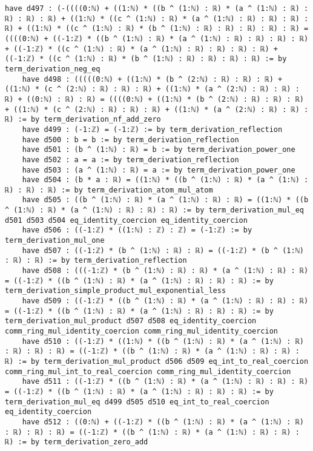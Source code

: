 \documentclass{article}
\begin{document}
\begin{tcolorbox}[colback=white!10, width=\linewidth]
\begin{lstlisting}[language=Lean4]
    have d497 : (-((((0:ℕ) + ((1:ℕ) * ((b ^ (1:ℕ) : ℝ) * (a ^ (1:ℕ) : ℝ) : ℝ) : ℝ) : ℝ) + ((1:ℕ) * ((c ^ (1:ℕ) : ℝ) * (a ^ (1:ℕ) : ℝ) : ℝ) : ℝ) : ℝ) + ((1:ℕ) * ((c ^ (1:ℕ) : ℝ) * (b ^ (1:ℕ) : ℝ) : ℝ) : ℝ) : ℝ) : ℝ) = ((((0:ℕ) + ((-1:ℤ) * ((b ^ (1:ℕ) : ℝ) * (a ^ (1:ℕ) : ℝ) : ℝ) : ℝ) : ℝ) + ((-1:ℤ) * ((c ^ (1:ℕ) : ℝ) * (a ^ (1:ℕ) : ℝ) : ℝ) : ℝ) : ℝ) + ((-1:ℤ) * ((c ^ (1:ℕ) : ℝ) * (b ^ (1:ℕ) : ℝ) : ℝ) : ℝ) : ℝ) := by term_derivation_neg_eq
    have d498 : (((((0:ℕ) + ((1:ℕ) * (b ^ (2:ℕ) : ℝ) : ℝ) : ℝ) + ((1:ℕ) * (c ^ (2:ℕ) : ℝ) : ℝ) : ℝ) + ((1:ℕ) * (a ^ (2:ℕ) : ℝ) : ℝ) : ℝ) + ((0:ℕ) : ℝ) : ℝ) = ((((0:ℕ) + ((1:ℕ) * (b ^ (2:ℕ) : ℝ) : ℝ) : ℝ) + ((1:ℕ) * (c ^ (2:ℕ) : ℝ) : ℝ) : ℝ) + ((1:ℕ) * (a ^ (2:ℕ) : ℝ) : ℝ) : ℝ) := by term_derivation_nf_add_zero
    have d499 : (-1:ℤ) = (-1:ℤ) := by term_derivation_reflection
    have d500 : b = b := by term_derivation_reflection
    have d501 : (b ^ (1:ℕ) : ℝ) = b := by term_derivation_power_one
    have d502 : a = a := by term_derivation_reflection
    have d503 : (a ^ (1:ℕ) : ℝ) = a := by term_derivation_power_one
    have d504 : (b * a : ℝ) = ((1:ℕ) * ((b ^ (1:ℕ) : ℝ) * (a ^ (1:ℕ) : ℝ) : ℝ) : ℝ) := by term_derivation_atom_mul_atom
    have d505 : ((b ^ (1:ℕ) : ℝ) * (a ^ (1:ℕ) : ℝ) : ℝ) = ((1:ℕ) * ((b ^ (1:ℕ) : ℝ) * (a ^ (1:ℕ) : ℝ) : ℝ) : ℝ) := by term_derivation_mul_eq d501 d503 d504 eq_identity_coercion eq_identity_coercion
    have d506 : ((-1:ℤ) * ((1:ℕ) : ℤ) : ℤ) = (-1:ℤ) := by term_derivation_mul_one
    have d507 : ((-1:ℤ) * (b ^ (1:ℕ) : ℝ) : ℝ) = ((-1:ℤ) * (b ^ (1:ℕ) : ℝ) : ℝ) := by term_derivation_reflection
    have d508 : (((-1:ℤ) * (b ^ (1:ℕ) : ℝ) : ℝ) * (a ^ (1:ℕ) : ℝ) : ℝ) = ((-1:ℤ) * ((b ^ (1:ℕ) : ℝ) * (a ^ (1:ℕ) : ℝ) : ℝ) : ℝ) := by term_derivation_simple_product_mul_exponential_less
    have d509 : ((-1:ℤ) * ((b ^ (1:ℕ) : ℝ) * (a ^ (1:ℕ) : ℝ) : ℝ) : ℝ) = ((-1:ℤ) * ((b ^ (1:ℕ) : ℝ) * (a ^ (1:ℕ) : ℝ) : ℝ) : ℝ) := by term_derivation_mul_product d507 d508 eq_identity_coercion comm_ring_mul_identity_coercion comm_ring_mul_identity_coercion
    have d510 : ((-1:ℤ) * ((1:ℕ) * ((b ^ (1:ℕ) : ℝ) * (a ^ (1:ℕ) : ℝ) : ℝ) : ℝ) : ℝ) = ((-1:ℤ) * ((b ^ (1:ℕ) : ℝ) * (a ^ (1:ℕ) : ℝ) : ℝ) : ℝ) := by term_derivation_mul_product d506 d509 eq_int_to_real_coercion comm_ring_mul_int_to_real_coercion comm_ring_mul_identity_coercion
    have d511 : ((-1:ℤ) * ((b ^ (1:ℕ) : ℝ) * (a ^ (1:ℕ) : ℝ) : ℝ) : ℝ) = ((-1:ℤ) * ((b ^ (1:ℕ) : ℝ) * (a ^ (1:ℕ) : ℝ) : ℝ) : ℝ) := by term_derivation_mul_eq d499 d505 d510 eq_int_to_real_coercion eq_identity_coercion
    have d512 : ((0:ℕ) + ((-1:ℤ) * ((b ^ (1:ℕ) : ℝ) * (a ^ (1:ℕ) : ℝ) : ℝ) : ℝ) : ℝ) = ((-1:ℤ) * ((b ^ (1:ℕ) : ℝ) * (a ^ (1:ℕ) : ℝ) : ℝ) : ℝ) := by term_derivation_zero_add

\end{lstlisting}
\end{tcolorbox}
\end{document}
